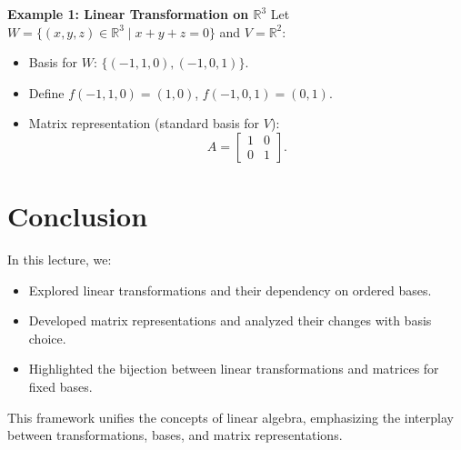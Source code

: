 \documentclass{article}
\begin{document}
\textbf{Example 1: Linear Transformation on $\mathbb{R}^3$}
Let $W = \{(x, y, z) \in \mathbb{R}^3 \mid x + y + z = 0\}$ and $V = \mathbb{R}^2$:
\begin{itemize}
  \item Basis for $W$: $\{(-1, 1, 0), (-1, 0, 1)\}$.
  \item Define $f(-1, 1, 0) = (1, 0)$, $f(-1, 0, 1) = (0, 1)$.
  \item Matrix representation (standard basis for $V$):
    \[
      A =
      \begin{bmatrix}
        1 & 0 \\
        0 & 1
      \end{bmatrix}.
    \]
\end{itemize}

\section*{Conclusion}

In this lecture, we:
\begin{itemize}
  \item Explored linear transformations and their dependency on ordered bases.
  \item Developed matrix representations and analyzed their changes with basis choice.
  \item Highlighted the bijection between linear transformations and matrices for fixed bases.
\end{itemize}

This framework unifies the concepts of linear algebra, emphasizing the interplay between transformations, bases, and matrix representations.
\end{document}
